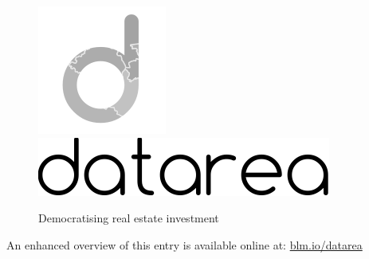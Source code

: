 \documentclass[
10pt, %
a4paper, %
oneside, %
headinclude,footinclude, %
BCOR5mm, %
]{scrartcl}
\begin{document}
\begin{figure}[h!]
\begin{center}
\includegraphics[width=.1\textwidth]{Figures/logo.png} \\
\includegraphics[scale=.4]{Figures/datarea.pdf} \\
\caption*{ {\sf Democratising real estate investment}}
\end{center}
\end{figure}

\vspace{1em}
\begin{flushright}
{\small An enhanced overview of this entry is available online at: \href{http://blm.io/datarea}{blm.io/datarea}}
\end{flushright}
\end{document}
